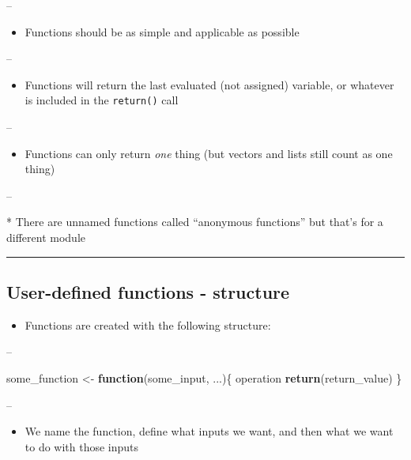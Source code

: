 \documentclass[]{article}
\newenvironment{Shaded}{\begin{snugshade}}{\end{snugshade}}
\newcommand{\ControlFlowTok}[1]{\textcolor[rgb]{0.13,0.29,0.53}{\textbf{#1}}}
\newcommand{\KeywordTok}[1]{\textcolor[rgb]{0.13,0.29,0.53}{\textbf{#1}}}
\newcommand{\NormalTok}[1]{#1}
\newcommand{\StringTok}[1]{\textcolor[rgb]{0.31,0.60,0.02}{#1}}
\providecommand{\tightlist}{%
  \setlength{\itemsep}{0pt}\setlength{\parskip}{0pt}}
\begin{document}
--

\begin{itemize}
\tightlist
\item
  Functions should be as simple and applicable as possible
\end{itemize}

--

\begin{itemize}
\tightlist
\item
  Functions will return the last evaluated (not assigned) variable, or
  whatever is included in the \texttt{return()} call
\end{itemize}

--

\begin{itemize}
\tightlist
\item
  Functions can only return \emph{one} thing (but vectors and lists
  still count as one thing)
\end{itemize}

--

* There are unnamed functions called ``anonymous functions'' but that's
for a different module

\begin{center}\rule{0.5\linewidth}{\linethickness}\end{center}

\hypertarget{user-defined-functions---structure}{%
\subsection{User-defined functions -
structure}\label{user-defined-functions---structure}}

\begin{itemize}
\tightlist
\item
  Functions are created with the following structure:
\end{itemize}

--

\begin{Shaded}
\begin{Highlighting}[]
\NormalTok{some_function <-}\StringTok{ }\ControlFlowTok{function}\NormalTok{(some_input, ...)\{}
\NormalTok{  operation}
  \KeywordTok{return}\NormalTok{(return_value)}
\NormalTok{\}}
\end{Highlighting}
\end{Shaded}

--

\begin{itemize}
\tightlist
\item
  We name the function, define what inputs we want, and then what we
  want to do with those inputs
\end{itemize}
\end{document}
